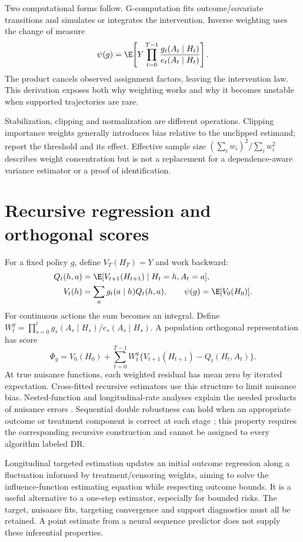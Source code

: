 Two computational forms follow. G-computation fits outcome/covariate
transitions and simulates or integrates the intervention. Inverse weighting
uses the change of measure
\begin{equation}
 \psi(g)=\E\!\left[Y\prod_{t=0}^{T-1}
       \frac{g_t(A_t\mid H_t)}{e_t(A_t\mid H_t)}\right].
 \label{eq:longipw}
\end{equation}
The product cancels observed assignment factors, leaving the intervention
law. This derivation exposes both why weighting works and why it becomes
unstable when supported trajectories are rare.

Stabilization, clipping and normalization are different operations.
Clipping importance weights generally introduces bias relative to the
unclipped estimand; report the threshold and its effect. Effective sample
size $(\sum_iw_i)^2/\sum_iw_i^2$ describes weight concentration but is not
a replacement for a dependence-aware variance estimator or a proof of
identification.

\section{Recursive regression and orthogonal scores}
For a fixed policy $g$, define $V_T(H_T)=Y$ and work backward:
\begin{align}
 Q_t(h,a)&=\E[V_{t+1}(H_{t+1})\mid H_t=h,A_t=a],\\
 V_t(h)&=\sum_a g_t(a\mid h)Q_t(h,a),\qquad \psi(g)=\E[V_0(H_0)].
 \label{eq:recursiveq}
\end{align}
For continuous actions the sum becomes an integral. Define
$W_t^g=\prod_{s=0}^t g_s(A_s\mid H_s)/e_s(A_s\mid H_s)$.
A population orthogonal representation has score
\begin{equation}
 \Phi_g=V_0(H_0)+
 \sum_{t=0}^{T-1}W_t^g
       \{V_{t+1}(H_{t+1})-Q_t(H_t,A_t)\}.
 \label{eq:longdr}
\end{equation}
At true nuisance functions, each weighted residual has mean zero by
iterated expectation. Cross-fitted recursive estimators use this structure
to limit nuisance bias. Nested-function and longitudinal-rate analyses
explain the needed products of nuisance errors
\citep{nested2022,singh2022}. Sequential double robustness can hold when
an appropriate outcome or treatment component is correct at each stage
\citep{sequentialdr2018}; this property requires the corresponding recursive
construction and cannot be assigned to every algorithm labeled DR.

Longitudinal targeted estimation updates an initial outcome regression
along a fluctuation informed by treatment/censoring weights, aiming to
solve the influence-function estimating equation while respecting outcome
bounds. It is a useful alternative to a one-step estimator, especially
for bounded risks. The target, nuisance fits, targeting convergence and
support diagnostics must all be retained. A point estimate from a neural
sequence predictor does not supply these inferential properties.

